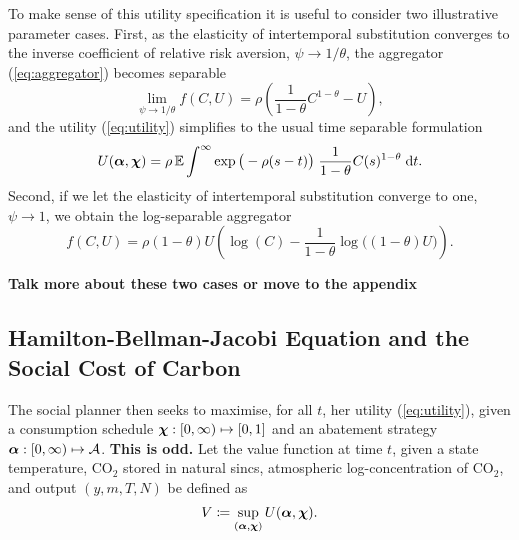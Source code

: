 \documentclass[../../main.tex]{subfiles}
\begin{document}
To make sense of this utility specification it is useful to consider two illustrative parameter cases. First, as the elasticity of intertemporal substitution converges to the inverse  coefficient of relative risk aversion, $\psi \to 1 / \theta$, the aggregator (\ref{eq:aggregator}) becomes separable \begin{equation}
    \lim_{\psi \to 1 / \theta} f(C, U) = \rho \left(\frac{1}{1 - \theta} C^{1 - \theta} - U\right),
\end{equation} and the utility (\ref{eq:utility}) simplifies to the usual time separable formulation \begin{equation}
    U(\bm{\alpha}, \bm{\chi}) = \rho\operatorname{\mathbb{E}} \int^{\infty} \exp\big(-\rho (s - t) \big) \; \frac{1}{1 - \theta} C(s)^{1 - \theta} \; \mathrm{d}t.
\end{equation} Second, if we let the elasticity of intertemporal substitution converge to one, $\psi \to 1$, we obtain the log-separable aggregator \begin{equation}
    f(C, U) = \rho (1 - \theta)U \left(\log(C) - \frac{1}{1 - \theta} \log\big( (1 - \theta) U \big) \right).
\end{equation}

\textbf{Talk more about these two cases or move to the appendix}

\subsection{Hamilton-Bellman-Jacobi Equation and the Social Cost of Carbon}

The social planner then seeks to maximise, for all $t$, her utility (\ref{eq:utility}), given a consumption schedule $\bm{\chi}: [0, \infty) \mapsto \mathcal [0, 1]$ and an abatement strategy $\bm{\alpha}: [0, \infty) \mapsto \mathcal{A}$. \textbf{This is odd.} Let the value function at time $t$, given a state temperature, CO$_2$ stored in natural sincs, atmospheric log-concentration of CO$_2$, and output $(y, m, T, N)$ be defined as \begin{equation}
    V \coloneqq \sup_{(\bm{\alpha}, \bm{\chi})} U(\bm{\alpha}, \bm{\chi}).
\end{equation}
\end{document}
